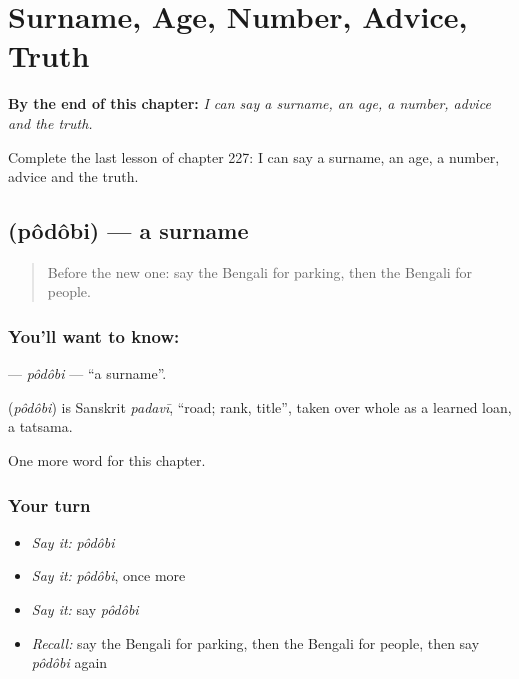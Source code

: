 
\chapter{Surname, Age, Number, Advice, Truth}
\label{ch:bn-surname-age-number-advice-truth}

\begin{chapteropening}
\textbf{By the end of this chapter:} \emph{I can say a surname, an age, a number, advice and the truth.}

Complete the last lesson of chapter 227: I can say a surname, an age, a number, advice and the truth.
\end{chapteropening}

\section[\texorpdfstring{\bn{পদবি} (pôdôbi)}{পদবি (pôdôbi)}]{ (pôdôbi) — a surname}

\label{lesson:BN-C227-podobi}



\begin{quote}
Before the new one: say the Bengali for parking, then the Bengali for people.
\end{quote}

\subsection*{You'll want to know: }
\textbf{} — \emph{pôdôbi} — \textquotedblleft{}a surname\textquotedblright{}.

\begin{cousinweb}
\textbf{} (\emph{pôdôbi}) is Sanskrit \emph{padavī}, \textquotedblleft{}road; rank, title\textquotedblright{}, taken over whole as a learned loan, a tatsama.
\end{cousinweb}

\begin{grammarlens}[title={What you've built}]
One more word for this chapter.
\end{grammarlens}

\subsection*{Your turn}
\begin{itemize}
\raggedright
  \item \emph{Say it:} \emph{pôdôbi}
  \item \emph{Say it:} \emph{pôdôbi}, once more
  \item \emph{Say it:} say \emph{pôdôbi}
  \item \emph{Recall:} say the Bengali for parking, then the Bengali for people, then say \emph{pôdôbi} again
\end{itemize}

